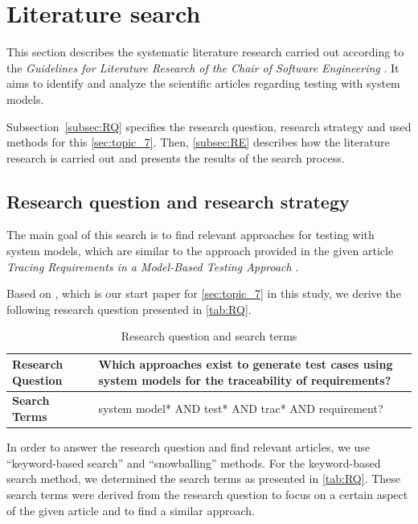 \section{Literature search}
\label{sec:LS}

This section describes the systematic literature research carried out according to the \textit{Guidelines for Literature Research of the Chair of Software Engineering} \cite{LRGuidelines}. It aims to identify and analyze the scientific articles regarding testing with system models. 

Subsection~\ref{subsec:RQ} specifies the research question, research strategy and used methods for this \autoref{sec:topic_7}. Then, \autoref{subsec:RE} describes how the literature research is carried out and presents the results of the search process. 


\subsection*{Research question and research strategy}
\label{subsec:RQ}
The main goal of this search is to find relevant approaches for testing with system models, which are similar to the approach provided in the given article \textit{Tracing Requirements in a Model-Based Testing Approach} \cite{Paper1}. 

Based on \cite{Paper1}, which is our start paper for \autoref{sec:topic_7} in this study, we derive the following research question presented in \autoref{tab:RQ}.

\begin{table} [htb] 
\centering
\begin{small}
\caption{Research question and search terms}
\label{tab:RQ}
\setlength{\tabcolsep}{1 em}
\begin{tabular}{ l| p{10cm}}
\hline
\textbf{Research Question} & Which approaches exist to generate test cases using system models for the traceability of requirements?\\
\hline
\textbf{Search Terms}  & system model* AND test* AND trac* AND requirement? \\
\hline
\end{tabular}
\end{small}
\end{table}

In order to answer the research question and find relevant articles, we use \enquote{keyword-based search} and \enquote{snowballing} methods. For the keyword-based search method, we determined the search terms as presented in \autoref{tab:RQ}. These search terms were derived from the research question to focus on a certain aspect of the given article \cite{Paper1} and to find a similar approach. 

